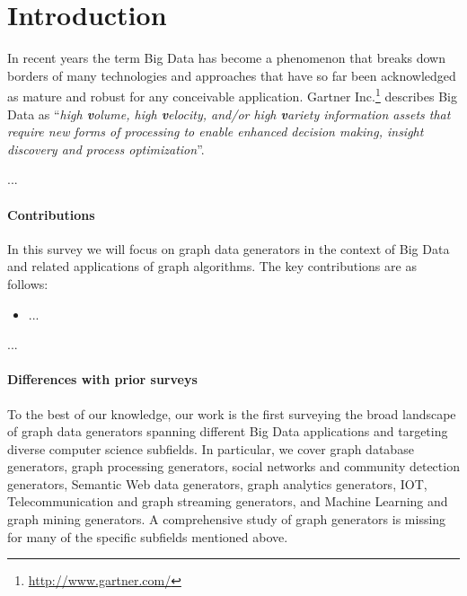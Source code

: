 \section{Introduction}
\label{sec:intro}

In recent years the term Big Data has become a phenomenon that breaks down borders of many technologies and approaches that have so far been acknowledged as mature and robust for any conceivable application. Gartner Inc.\footnote{\url{http://www.gartner.com/}} describes Big Data as ``\emph{high \textbf{v}olume, high \textbf{v}elocity, and/or high \textbf{v}ariety information assets that require new forms of processing to enable enhanced decision making, insight discovery and process optimization}''.

...


\paragraph*{Contributions} In this survey we will focus on graph data generators in the context of Big Data and related applications of graph algorithms. The key contributions are as follows:
\begin{itemize}
  \item ...
\end{itemize}

...

\paragraph*{Differences with prior surveys}

To the best of our knowledge, our work is the first surveying the broad landscape of graph data generators spanning different Big Data applications and 
targeting diverse computer science subfields. In particular, we cover graph database
generators, graph processing generators, social networks and community detection
generators, Semantic Web data generators, graph
analytics generators, IOT, Telecommunication and graph streaming generators, 
and Machine Learning and graph mining generators. A comprehensive study of
graph generators is missing for many of the specific subfields mentioned
above.   


